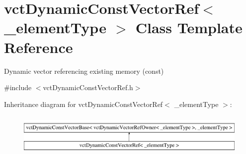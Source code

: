 \hypertarget{classvct_dynamic_const_vector_ref}{}\section{vct\+Dynamic\+Const\+Vector\+Ref$<$ \+\_\+element\+Type $>$ Class Template Reference}
\label{classvct_dynamic_const_vector_ref}


Dynamic vector referencing existing memory (const)  




{\ttfamily \#include $<$vct\+Dynamic\+Const\+Vector\+Ref.\+h$>$}

Inheritance diagram for vct\+Dynamic\+Const\+Vector\+Ref$<$ \+\_\+element\+Type $>$\+:\begin{figure}[H]
\begin{center}
\leavevmode
\includegraphics[height=2.000000cm]{d4/dab/classvct_dynamic_const_vector_ref}
\end{center}
\end{figure}
